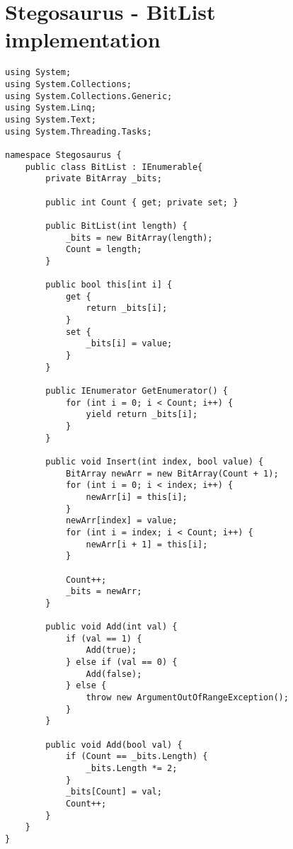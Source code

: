 \chapter{Stegosaurus - BitList implementation}
\begin{lstlisting}
using System;
using System.Collections;
using System.Collections.Generic;
using System.Linq;
using System.Text;
using System.Threading.Tasks;

namespace Stegosaurus {
    public class BitList : IEnumerable{
        private BitArray _bits;

        public int Count { get; private set; }

        public BitList(int length) {
            _bits = new BitArray(length);
            Count = length;
        }

        public bool this[int i] {
            get {
                return _bits[i];
            }
            set {
                _bits[i] = value;
            }
        }

        public IEnumerator GetEnumerator() {
            for (int i = 0; i < Count; i++) {
                yield return _bits[i];
            }
        }

        public void Insert(int index, bool value) {
            BitArray newArr = new BitArray(Count + 1);
            for (int i = 0; i < index; i++) {
                newArr[i] = this[i];
            }
            newArr[index] = value;
            for (int i = index; i < Count; i++) {
                newArr[i + 1] = this[i];
            }

            Count++;
            _bits = newArr;
        }

        public void Add(int val) {
            if (val == 1) {
                Add(true);
            } else if (val == 0) {
                Add(false);
            } else {
                throw new ArgumentOutOfRangeException();
            }
        }

        public void Add(bool val) {
            if (Count == _bits.Length) {
                _bits.Length *= 2;
            }
            _bits[Count] = val;
            Count++;
        }
    }
}
\end{lstlisting}